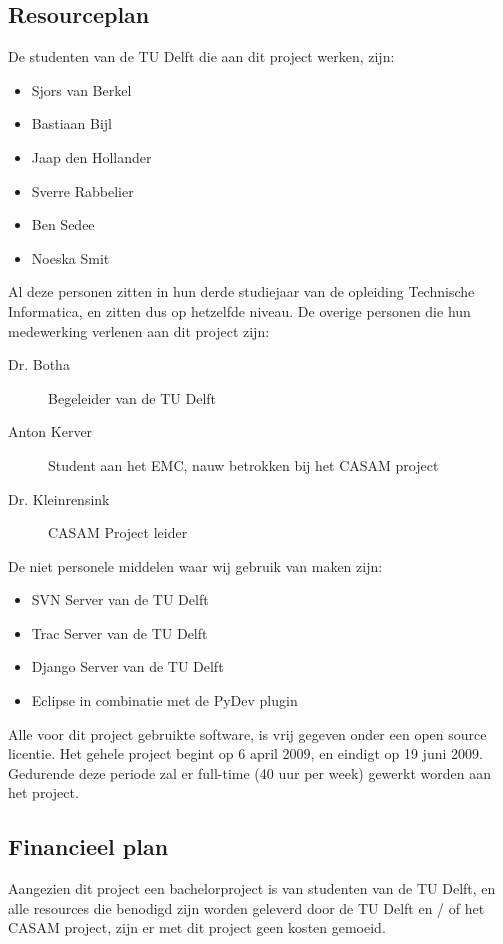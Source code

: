 \subsection{Resourceplan}
De studenten van de TU Delft die aan dit project werken, zijn:
\begin{itemize}
	\item Sjors van Berkel
	\item Bastiaan Bijl
	\item Jaap den Hollander
	\item Sverre Rabbelier
	\item Ben Sedee
	\item Noeska Smit
\end{itemize}
Al deze personen zitten in hun derde studiejaar van de opleiding Technische Informatica, en zitten dus op hetzelfde niveau. 
De overige personen die hun medewerking verlenen aan dit project zijn:
\begin{description}
	\item[Dr. Botha] Begeleider van de TU Delft
	\item[Anton Kerver] Student aan het EMC, nauw betrokken bij het CASAM project
	\item[Dr. Kleinrensink] CASAM Project leider
\end{description}
De niet personele middelen waar wij gebruik van maken zijn:
\begin{itemize}
	\item SVN Server van de TU Delft
	\item Trac Server van de TU Delft
	\item Django Server van de TU Delft
	\item Eclipse in combinatie met de PyDev plugin
\end{itemize}
Alle voor dit project gebruikte software, is vrij gegeven onder een open source licentie.
Het gehele project begint op 6 april 2009, en eindigt op 19 juni 2009. 
Gedurende deze periode zal er full-time (40 uur per week) gewerkt worden aan het project.


\subsection{Financieel plan}
Aangezien dit project een bachelorproject is van studenten van de TU Delft, en alle resources die benodigd zijn worden geleverd door de TU Delft en / of het CASAM project, zijn er met dit project geen kosten gemoeid.
